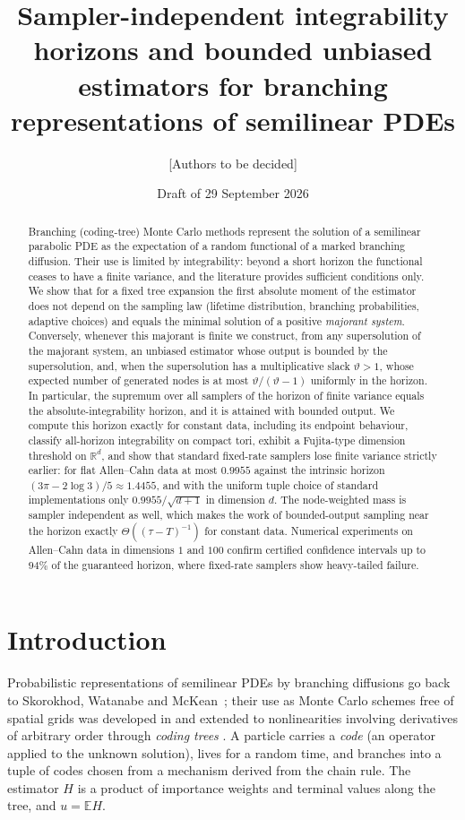 \documentclass[11pt]{article}
\title{Sampler-independent integrability horizons and bounded unbiased
estimators for branching representations of semilinear PDEs}
\author{[Authors to be decided]}
\date{Draft of 29 September 2026}
\theoremstyle{definition}
\theoremstyle{remark}
\newcommand{\R}{\mathbb{R}}
\newcommand{\E}{\mathbb{E}}
\begin{document}
\maketitle

\begin{abstract}
Branching (coding-tree) Monte Carlo methods represent the solution of a
semilinear parabolic PDE as the expectation of a random functional of a
marked branching diffusion. Their use is limited by integrability: beyond
a short horizon the functional ceases to have a finite variance, and the
literature provides sufficient conditions only. We show that for a fixed
tree expansion the first absolute moment of the estimator does not depend
on the sampling law (lifetime distribution, branching probabilities,
adaptive choices) and equals the minimal solution of a positive
\emph{majorant system}. Conversely, whenever this majorant is finite we
construct, from any supersolution of the majorant system, an unbiased
estimator whose output is bounded by the supersolution, and, when the
supersolution has a multiplicative slack $\vartheta>1$, whose expected
number of generated nodes is at most $\vartheta/(\vartheta-1)$ uniformly in
the horizon. In particular, the supremum over all samplers of the horizon
of finite variance equals the absolute-integrability horizon, and it is
attained with bounded output. We compute this horizon exactly for constant
data, including its endpoint behaviour, classify all-horizon integrability
on compact tori, exhibit a Fujita-type dimension threshold on $\R^d$, and
show that standard fixed-rate samplers lose finite variance strictly
earlier: for flat Allen--Cahn data at most $0.9955$ against the intrinsic
horizon $(3\pi-2\log 3)/5\approx 1.4455$, and with the uniform tuple
choice of standard implementations only $0.9955/\sqrt{d+1}$ in dimension
$d$. The node-weighted mass is sampler independent as well, which makes
the work of bounded-output sampling near the horizon exactly
$\Theta((\tau-T)^{-1})$ for constant data. Numerical experiments on
Allen--Cahn data in dimensions $1$ and $100$ confirm certified confidence
intervals up to $94\%$ of the guaranteed horizon, where fixed-rate
samplers show heavy-tailed failure.
\end{abstract}

\section{Introduction}

Probabilistic representations of semilinear PDEs by branching diffusions
go back to Skorokhod, Watanabe and McKean~\cite{McKean75}; their use as
Monte Carlo schemes free of spatial grids was developed in
\cite{HLTT14,HLOTTW19,HLT21,AC20} and extended to nonlinearities involving
derivatives of arbitrary order through \emph{coding trees}
\cite{NPP23,NPP24}. A particle carries a \emph{code} (an operator applied
to the unknown solution), lives for a random time, and branches into a
tuple of codes chosen from a mechanism derived from the chain rule. The
estimator $H$ is a product of importance weights and terminal values
along the tree, and $u=\E H$.
\end{document}
